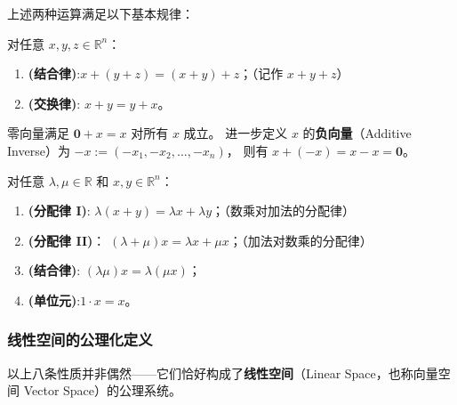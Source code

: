 \documentclass[lang=cn,11pt]{elegantbook}
\begin{document}
上述两种运算满足以下基本规律：

\begin{property}[加法的运算律]
对任意 $x,y,z\in\mathbb R^n$：
\begin{enumerate}
  \item\textbf{(结合律)}:$x+(y+z)=(x+y)+z$；（记作 $x+y+z$）
  \item\textbf{(交换律)}: $x+y=y+x$。
\end{enumerate}
\end{property}

零向量满足 $\boldsymbol 0+x=x$ 对所有 $x$ 成立。
进一步定义 $x$ 的\textbf{负向量}（Additive Inverse）为 $-x:=(-x_1,-x_2,\dots,-x_n)$，
则有 $x+(-x)=x-x=\boldsymbol 0$。

\begin{property}[数乘的运算律]
对任意 $\lambda,\mu\in\mathbb R$ 和 $x,y\in\mathbb R^n$：
\begin{enumerate}
  \item\textbf{(分配律 I)}: $\lambda(x+y)=\lambda x+\lambda y$；（数乘对加法的分配律）
  \item\textbf{(分配律 II)}： $(\lambda+\mu)x=\lambda x+\mu x$；（加法对数乘的分配律）
  \item\textbf{(结合律)}: $(\lambda\mu)x=\lambda(\mu x)$；
  \item\textbf{(单位元)}:$1\cdot x=x$。
\end{enumerate}
\end{property}

\subsubsection{线性空间的公理化定义}

以上八条性质并非偶然——它们恰好构成了\textbf{线性空间}（Linear Space，也称向量空间 Vector Space）的公理系统。
\end{document}
